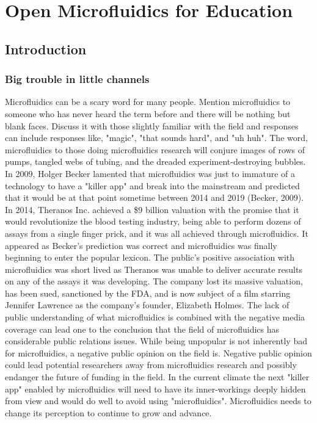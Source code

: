 \chapter{Open Microfluidics for Education}
\label{App:OpenMicrofluidics}

\section{Introduction}

\subsection{Big trouble in little channels}
Microfluidics can be a scary word for many people. Mention microfluidics to someone who has never heard the term before and there will be nothing but blank faces. Discuss it with those slightly familiar with the field and responses can include responses like, "magic", "that sounds hard", and "uh huh". The word, microfluidics to those doing microfluidics research will conjure images of rows of pumps, tangled webs of tubing, and the dreaded experiment-destroying bubbles.
In 2009, Holger Becker lamented that microfluidics was just to immature of a technology to have a "killer app" and break into the mainstream and predicted that it would be at that point sometime between 2014 and 2019 (Becker, 2009). In 2014, Theranos Inc. achieved a \$9 billion valuation with the promise that it would revolutionize the blood testing industry, being able to perform dozens of assays from a single finger prick, and it was all achieved through microfluidics. It appeared as Becker's prediction was correct and microfluidics was finally beginning to enter the popular lexicon. The public's positive association with microfluidics was short lived as Theranos was unable to deliver accurate results on any of the assays it was developing. The company lost its massive valuation, has been sued, sanctioned by the FDA, and is now subject of a film starring Jennifer Lawrence as the company's founder, Elizabeth Holmes. The lack of public understanding of what microfluidics is combined with the negative media coverage can lead one to the conclusion that the field of microfluidics has considerable public relations issues. While being unpopular is not inherently bad for microfluidics, a negative public opinion on the field is. Negative public opinion could lead potential researchers away from microfluidics research and possibly endanger the future of funding in the field. In the current climate the next "killer app" enabled by microfluidics will need to have its inner-workings deeply hidden from view and would do well to avoid using "microfluidics". Microfluidics needs to change its perception to continue to grow and advance.

